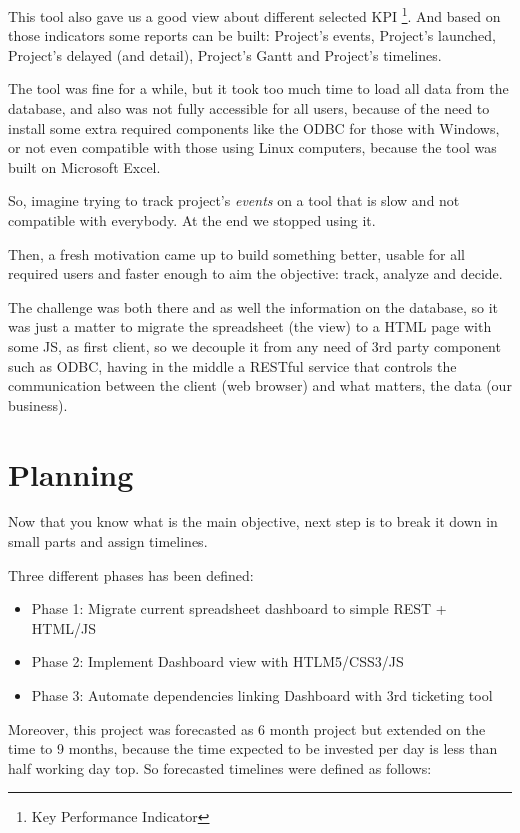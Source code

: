 \documentclass[a4paper,12pt,english]{book}
\begin{document}
This tool also gave us a good view about different selected KPI \footnote{Key
Performance Indicator}. And based on those indicators some reports can be
built:
Project's events, Project's launched, Project's delayed (and detail), Project's
Gantt and Project's timelines.

The tool was fine for a while, but it took too much time to load all data
from the database, and also was not fully accessible for all users, because
of the need to install some extra required components like the ODBC for those with
Windows, or not even compatible with those using Linux computers, because the
tool was built on Microsoft Excel.

So, imagine trying to track project's \emph{events} on a tool that is slow
and not compatible with everybody. At the end we stopped using it.

Then, a fresh motivation came up to build something better,
usable for all required users and faster enough to aim the objective: track,
analyze and decide. 

The challenge was both there and as well the information on the database, so it
was just a matter to migrate the spreadsheet (the view) to a HTML page with some JS,
as first client, so we decouple it from any need of 3rd party component such as
ODBC, having in the middle a RESTful service that
controls the communication between the client (web browser) and what matters,
the data (our business).

\chapter*{Planning}
Now that you know what is the main objective, next step is to break it down in
small parts and assign timelines.

Three different phases has been defined:
\begin{itemize}
	\item Phase 1: Migrate current spreadsheet dashboard to simple REST +
	HTML/JS
	\item Phase 2: Implement Dashboard view with HTLM5/CSS3/JS
	\item Phase 3: Automate dependencies linking Dashboard with 3rd ticketing
	tool
\end{itemize}

Moreover, this project was forecasted as 6 month project but extended on
the time to 9 months, because the time expected to be invested per day is less
than half working day top. So forecasted timelines were defined as follows:
\end{document}
